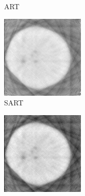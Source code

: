 \documentclass[journal]{IEEEtran}
\begin{document}
\begin{figure}[!h]
\begin{subfigure}[b]{0.24\linewidth}
        \caption{ART}
     \end{subfigure}
    \begin{subfigure}[b]{0.24\linewidth}
        \includegraphics[width=\textwidth]{../images/potato/2D/sart.png}
        \caption{SART}
     \end{subfigure}
    \begin{subfigure}[b]{0.24\linewidth}
        \includegraphics[width=\textwidth]{../images/potato/2D/sirt.png}

\end{subfigure}
\end{figure}
\end{document}
